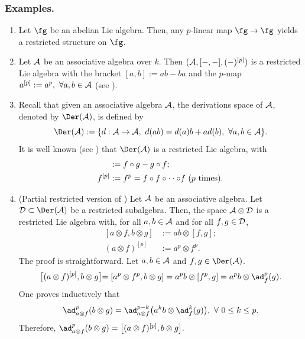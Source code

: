\documentclass[12pt]{article}
\newcommand {\A}{{\cal{A}}}
\newcommand{\D}{{\cal{D}}}
\begin{document}
\subsubsection{Examples.}
\label{examplesun}
\begin{enumerate}
\item[($i$)] Let $\fg$ be an abelian Lie algebra. Then, any $p$-linear map $\fg\rightarrow\fg$ yields a restricted structure on $\fg$.
\item[($ii$)] Let $\A$ be an associative algebra over $k$. Then $(\A,[-,-],(-)^{[p]})$ is a restricted Lie algebra with the bracket  $[a,b]:=ab-ba$ and the $p$-map $a^{[p]}:=a^p,~\forall a,b\in \A$  (see \cite[Section 2.1]{SF}).
\item[($iii$)] Recall that given an associative algebra $\A$, the derivations space of $\A$, denoted by $\Der(\A)$, is defined by
\begin{equation*}
    \Der(\A):=\{d:\A\rightarrow\A,~d(ab)=d(a)b+ad(b),~\forall a,b\in \A\}.
\end{equation*}
It is well known (see \cite{J}) that $\Der(\A)$ is a restricted Lie algebra, with
\begin{align*}
    [f,g]&:=f\circ g-g\circ f;\\
    f^{[p]}&:=f^p={f\circ f\circ \cdot  \cdot \circ f} \,\,(p ~{\rm times}).
\end{align*}
\item [($iv$)]
(Partial restricted version of \cite[Theorem 3.1]{JZ})\label{prop:tensorderivation}
    Let $\A$ be an  associative algebra. Let $\D\subset\Der(\A)$ be a restricted subalgebra. Then, the space $\A\otimes\D$ is a restricted Lie algebra with, for all $a,b\in \A$ and for all $f,g\in\D$,
    \begin{align}\label{eq:tensorbracket}
        [a\otimes f,b\otimes g]&:=ab\otimes[f,g]; \\
        (a\otimes f)^{[p]}&:=a^p\otimes f^p. \nonumber
    \end{align}
    The proof is straightforward. Let $a,b\in \A$ and $f,g\in\Der(\A)$.
    \begin{align*}
        \bigl[(a\otimes f)^{[p]},b\otimes g\bigl]=[a^p\otimes f^p,b\otimes g]=a^pb\otimes[f^p,g]=a^pb\otimes\ad^p_f(g).
    \end{align*}
    One proves inductively that 
    \begin{equation*}
        \ad^p_{a\otimes f}(b\otimes g)=\ad^{p-k}_{a\otimes f}\bigl(a^kb\otimes \ad^k_f(g)\bigl),~\forall~ 0\leq k\leq p.
    \end{equation*} Therefore, $\ad^p_{a\otimes f}(b\otimes g)= \bigl[(a\otimes f)^{[p]},b\otimes g\bigl].$
    \end{enumerate}
\end{document}
